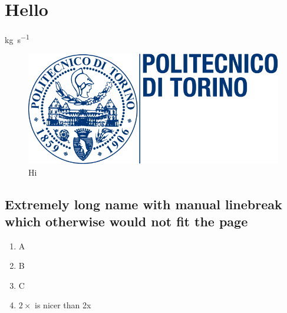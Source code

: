 \chapter{Hello}
\label{sec:hello}

\cite[Hi][Goofy]{IEEEexample:article_typical}

\si{\kilo\gram\per\second}

\begin{figure}[h]
\centering
\includegraphics[width=.9\linewidth]{images/logo/logoPoliTo_with_name_wrong.png}
\caption{Hi}
\label{fig:hi}
\end{figure}

\section[Extremely long name with manual linebreak which otherwise would not fit the page]{Extremely long name with manual linebreak\\which otherwise would not fit the page} %

\begin{enumerate}
    \item A
    \item B
    \item C
    \item $2\times$ is nicer than 2x
\end{enumerate}

